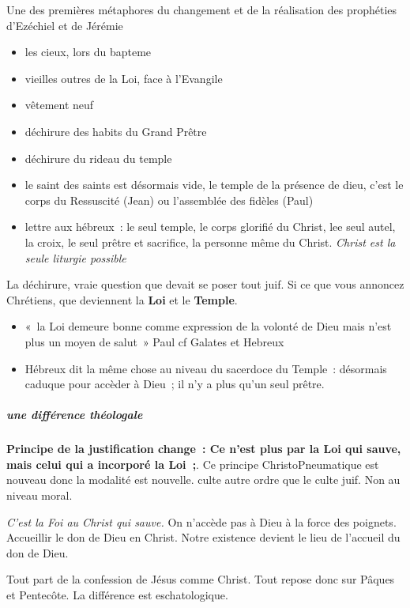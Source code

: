 Une des premières métaphores du changement et de la réalisation des
prophéties d'Ezéchiel et de Jérémie

\begin{itemize}
\item
  les cieux, lors du bapteme
\item
  vieilles outres de la Loi, face à l'Evangile
\item
  vêtement neuf
\item
  déchirure des habits du Grand Prêtre
\item
  déchirure du rideau du temple
\item
  le saint des saints est désormais vide, le temple de la présence de
  dieu, c'est le corps du Ressuscité (Jean) ou l'assemblée des fidèles
  (Paul)
\item
  lettre aux hébreux~: le seul temple, le corps glorifié du Christ, lee
  seul autel, la croix, le seul prêtre et sacrifice, la personne même du
  Christ. \emph{Christ est la seule liturgie possible}
\end{itemize}

La déchirure, vraie question que devait se poser tout juif. Si ce que
vous annoncez Chrétiens, que deviennent la \textbf{Loi} et le
\textbf{Temple}.

\begin{itemize}
\item
  «~la Loi demeure bonne comme expression de la volonté de Dieu mais
  n'est plus un moyen de salut~» Paul cf Galates et Hebreux
\item
  Hébreux dit la même chose au niveau du sacerdoce du Temple~: désormais
  caduque pour accèder à Dieu~; il n'y a plus qu'un seul prêtre.
\end{itemize}

\hypertarget{une-diffuxe9rence-thuxe9ologale}{%
\subparagraph{une différence
théologale}\label{une-diffuxe9rence-thuxe9ologale}}

\textbf{Principe de la justification change~: Ce n'est plus par la Loi
qui sauve, mais celui qui a incorporé la Loi~;}. Ce principe
ChristoPneumatique est nouveau donc la modalité est nouvelle. culte
autre ordre que le culte juif. Non au niveau moral.

\emph{C'est la Foi au Christ qui sauve.} On n'accède pas à Dieu à la
force des poignets. Accueillir le don de Dieu en Christ. Notre existence
devient le lieu de l'accueil du don de Dieu.

Tout part de la confession de Jésus comme Christ. Tout repose donc sur
Pâques et Pentecôte. La différence est eschatologique.

